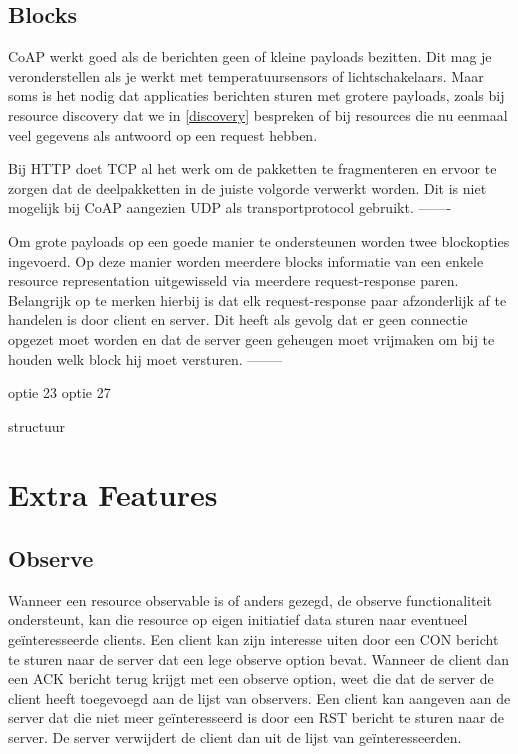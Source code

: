 \subsection{Blocks}
CoAP werkt goed als de berichten geen of kleine payloads bezitten. Dit mag je veronderstellen als je werkt met temperatuursensors of lichtschakelaars. Maar soms is het nodig dat applicaties berichten sturen met grotere payloads, zoals bij resource discovery dat we in \ref{discovery} bespreken of bij resources die nu eenmaal veel gegevens als antwoord op een request hebben.

Bij HTTP doet TCP al het werk om de pakketten te fragmenteren en ervoor te zorgen dat de deelpakketten in de juiste volgorde verwerkt worden. Dit is niet mogelijk bij CoAP aangezien UDP als transportprotocol gebruikt. -------

Om grote payloads op een goede manier te ondersteunen worden twee blockopties ingevoerd. Op deze manier worden meerdere blocks informatie van een enkele resource representation uitgewisseld via meerdere request-response paren. Belangrijk op te merken hierbij is dat elk request-response paar afzonderlijk af te handelen is door client en server. Dit heeft als gevolg dat er geen connectie opgezet moet worden en dat de server geen geheugen moet vrijmaken om bij te houden welk block hij moet versturen. --------

optie 23
optie 27

structuur


\section{Extra Features}

\subsection{Observe}

Wanneer een resource observable is of anders gezegd, de observe functionaliteit ondersteunt, kan die resource op eigen initiatief data sturen naar eventueel ge\"{i}nteresseerde clients. Een client kan zijn interesse uiten door een CON bericht te sturen naar de server dat een lege observe option bevat. Wanneer de client dan een ACK bericht terug krijgt met een observe option, weet die dat de server de client heeft toegevoegd aan de lijst van observers. Een client kan aangeven aan de server dat die niet meer ge\"{i}nteresseerd is door een RST bericht te sturen naar de server. De server verwijdert de client dan uit de lijst van ge\"{i}nteresseerden.

